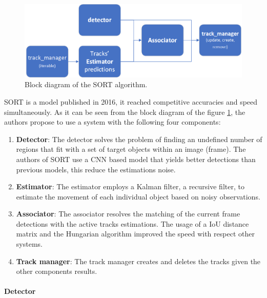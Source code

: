 
\begin{figure}[!t]
    \centering
    \includegraphics[width=0.9\linewidth]{figures/04_state_of_the_art/SORT.png}
    \caption[SORT algorithm]{\footnotesize{Block diagram of the SORT algorithm.}}
    \label{fig:sort}
\end{figure}

{
    \ac{SORT}\cite{Bewley2016_sort} is a model published in 2016, it reached competitive accuracies and speed simultaneously. 
    As it can be seen from the block diagram of the figure \ref{fig:sort}, the authors propose to use a system with the following four components:
}

\begin{enumerate}
    \item \textbf{Detector}: The detector solves the problem of finding an undefined number of regions that fit with a set of target objects within an image (frame). 
    The authors of \ac{SORT} use a \ac{CNN} based model that yields better detections than previous models, this reduce the estimations noise.
    \item \textbf{Estimator}: The estimator employs a Kalman filter, a recursive filter, to estimate the movement of each individual object based on noisy observations.
    \item \textbf{Associator}: The associator resolves the matching of the current frame detections with the active tracks estimations. The usage of a \ac{IoU} distance matrix and the Hungarian algorithm improved the speed with respect other systems.
    \item \textbf{Track manager}: The track manager creates and deletes the tracks given the other components results.
\end{enumerate}


\paragraph{Detector}

